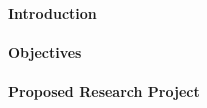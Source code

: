 \setcounter{page}{1}

\paragraph*{Introduction}

\paragraph*{Objectives}

\paragraph*{Proposed Research Project}
